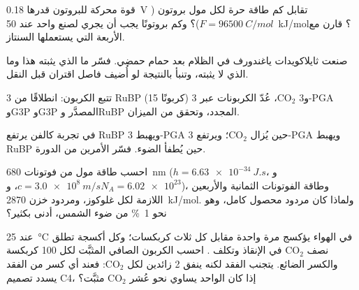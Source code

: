 \begin{exercise}[$\star\star$]\label{exo:b1:photosynthesis:6}
قوة محركة للبروتون قدرها \qty{0.18}{V} تقابل كم طاقة حرة لكل مول
بروتون ($F = \qty{96500}{C/mol}$)؟ وكم بروتونًا يجب أن يجري لصنع
 واحد عند \qty{50}{kJ/mol}؟ قارن مع الأربعة التي يستعملها
السنتاز.
\end{exercise}

\begin{exercise}[$\star\star$]\label{exo:b1:photosynthesis:7}
صنعت ثايلاكويدات ياغندورف  في الظلام بعد حمام حمضي. فسّر ما الذي
يثبته هذا وما الذي لا يثبته، وتنبأ بالنتيجة لو أُضيف فاصل اقتران قبل
النقل.
\end{exercise}

\begin{exercise}[$\star\star$]\label{exo:b1:photosynthesis:8}
تتبع الكربون: انطلاقًا من 3 RuBP (15 كربونًا) و3 $\mathrm{CO_2}$،
عُدّ الكربونات عبر 3-PGA وG3P وG3P المصدَّر وRuBP المجدد، وتحقق من
الميزان.
\end{exercise}

\begin{exercise}[$\star\star$]\label{exo:b1:photosynthesis:9}
في تجربة كالفن يرتفع RuBP ويهبط 3-PGA حين يُزال $\mathrm{CO_2}$؛
ويرتفع 3-PGA ويهبط RuBP حين يُطفأ الضوء. فسّر الأمرين من الدورة.
\end{exercise}

\begin{exercise}[$\star\star\star$]\label{exo:b1:photosynthesis:10}
احسب طاقة مول من فوتونات \qty{680}{nm} ($h =
\qty{6.63e-34}{J.s}$،
و$c = \qty{3.0e8}{m/s}$، و$N_A = \num{6.02e23}$)، وطاقة الفوتونات
الثمانية والأربعين اللازمة لكل غلوكوز، ومردود خزن \qty{2870}{kJ/mol}.
ولماذا كان مردود محصول كامل، وهو نحو \qty{1}{\%} من ضوء الشمس، أدنى
بكثير؟
\end{exercise}

\begin{exercise}[$\star\star\star$]\label{exo:b1:photosynthesis:11}
عند \qty{25}{\celsius} في الهواء يؤكسج  مرة واحدة مقابل كل
ثلاث كربكسات؛ وكل أكسجة تطلق نصف $\mathrm{CO_2}$ في الإنقاذ وتكلف
. احسب الكربون الصافي المثبَّت لكل 100 كربكسة والكسر الضائع.
 يتجنب الفقد لكنه ينفق 2  زائدين لكل $\mathrm{CO_2}$:
فعند أي كسر من الفقد يسدد تصميم C4، إذا كان  الواحد يساوي نحو
عُشر $\mathrm{CO_2}$ مثبَّت؟
\end{exercise}


